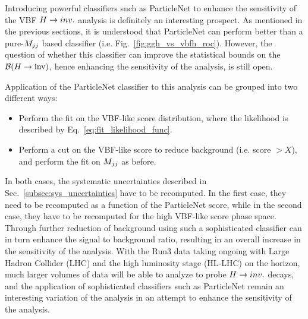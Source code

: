 Introducing powerful classifiers such as ParticleNet to enhance the sensitivity of the VBF $H \rightarrow inv.$ analysis
is definitely an interesting prospect. As mentioned in the previous sections, it is understood that ParticleNet can perform
better than a pure-$M_{jj}$ based classifier (i.e. Fig.~\ref{fig:ggh_vs_vbfh_roc}). However, the question of whether this
classifier can improve the statistical bounds on the ${\mathcal{B}(H\rightarrow\text{inv})}$, hence enhancing the sensitivity of the analysis, is still open.

Application of the ParticleNet classifier to this analysis can be grouped into two different ways:

\begin{itemize}
    \item Perform the fit on the VBF-like score distribution, where the likelihood is described by Eq.~\ref{eq:fit_likelihood_func}.
    \item Perform a cut on the VBF-like score to reduce background (i.e. score $> X$), and perform the fit on $M_{jj}$ as before.
\end{itemize}

In both cases, the systematic uncertainties described in Sec.~\ref{subsec:sys_uncertainties} have to be recomputed. In the first case,
they need to be recomputed as a function of the ParticleNet score, while in the second case, they have to be recomputed for the high
VBF-like score phase space. Through further reduction of background using such a sophisticated classifier can in turn enhance the signal
to background ratio, resulting in an overall increase in the sensitivity of the analysis. With the Run3 data taking ongoing with Large
Hadron Collider (LHC) and the high luminosity stage (HL-LHC) on the horizon, much larger volumes of data will be able to analyze to probe
$H \rightarrow inv.$ decays, and the application of sophisticated classifiers such as ParticleNet remain an interesting variation of the analysis in
an attempt to enhance the sensitivity of the analysis.